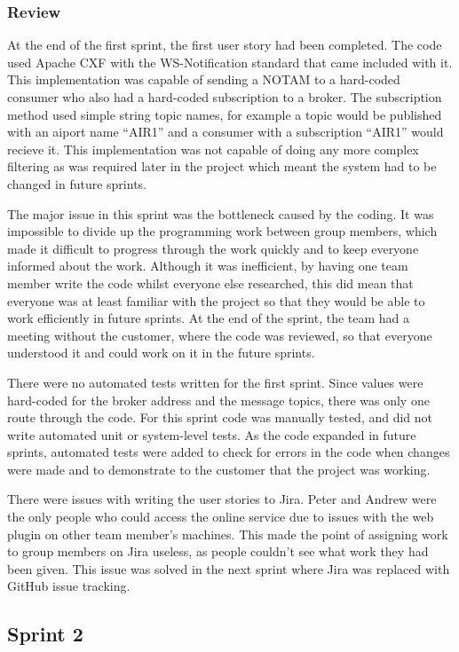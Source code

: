 \documentclass[a4paper, 12pt, twoside]{article}
\begin{document}
\subsubsection{Review}

At the end of the first sprint, the first user story had been completed. The code used Apache CXF with the WS-Notification standard that came included with it. This implementation was capable of sending a NOTAM to a hard-coded consumer who also had a hard-coded subscription to a broker. The subscription method used simple string topic names, for example a topic would be published with an aiport name ``AIR1'' and a consumer with a subscription ``AIR1'' would recieve it. This implementation was not capable of doing any more complex filtering as was required later in the project which meant the system had to be changed in future sprints.

The major issue in this sprint was the bottleneck caused by the coding. It was impossible to divide up the programming work between group members, which made it difficult to progress through the work quickly and to keep everyone informed about the work. Although it was inefficient, by having one team member write the code whilst everyone else researched, this did mean that everyone was at least familiar with the project so that they would be able to work efficiently in future sprints. At the end of the sprint, the team had a meeting without the customer, where the code was reviewed, so that everyone understood it and could work on it in the future sprints.

There were no automated tests written for the first sprint. Since values were hard-coded for the broker address and the message topics, there was only one route through the code. For this sprint code was manually tested, and did not write automated unit or system-level tests. As the code expanded in future sprints, automated tests were added to check for errors in the code when changes were made and to demonstrate to the customer that the project was working.

There were issues with writing the user stories to Jira. Peter and Andrew were the only people who could access the online service due to issues with the web plugin on other team member's machines. This made the point of assigning work to group members on Jira useless, as people couldn't see what work they had been given. This issue was solved in the next sprint where Jira was replaced with GitHub issue tracking.

\subsection{Sprint 2}
\label{sec:impl_sprint_2}
\end{document}
